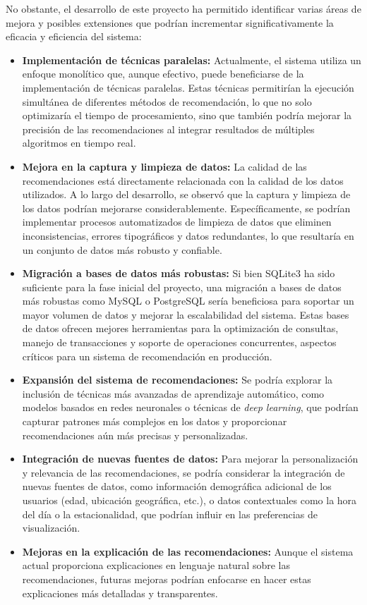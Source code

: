 \documentclass{llncs}
\begin{document}
	No obstante, el desarrollo de este proyecto ha permitido identificar varias áreas de mejora y posibles extensiones que podrían incrementar significativamente la eficacia y eficiencia del sistema:
	
	\begin{itemize}
		\item \textbf{Implementación de técnicas paralelas:} Actualmente, el sistema utiliza un enfoque monolítico que, aunque efectivo, puede beneficiarse de la implementación de técnicas paralelas. Estas técnicas permitirían la ejecución simultánea de diferentes métodos de recomendación, lo que no solo optimizaría el tiempo de procesamiento, sino que también podría mejorar la precisión de las recomendaciones al integrar resultados de múltiples algoritmos en tiempo real.
		
		\item \textbf{Mejora en la captura y limpieza de datos:} La calidad de las recomendaciones está directamente relacionada con la calidad de los datos utilizados. A lo largo del desarrollo, se observó que la captura y limpieza de los datos podrían mejorarse considerablemente. Específicamente, se podrían implementar procesos automatizados de limpieza de datos que eliminen inconsistencias, errores tipográficos y datos redundantes, lo que resultaría en un conjunto de datos más robusto y confiable.
		
		\item \textbf{Migración a bases de datos más robustas:} Si bien SQLite3 ha sido suficiente para la fase inicial del proyecto, una migración a bases de datos más robustas como MySQL o PostgreSQL sería beneficiosa para soportar un mayor volumen de datos y mejorar la escalabilidad del sistema. Estas bases de datos ofrecen mejores herramientas para la optimización de consultas, manejo de transacciones y soporte de operaciones concurrentes, aspectos críticos para un sistema de recomendación en producción.
		
		\item \textbf{Expansión del sistema de recomendaciones:} Se podría explorar la inclusión de técnicas más avanzadas de aprendizaje automático, como modelos basados en redes neuronales o técnicas de \textit{deep learning}, que podrían capturar patrones más complejos en los datos y proporcionar recomendaciones aún más precisas y personalizadas.
		
		\item \textbf{Integración de nuevas fuentes de datos:} Para mejorar la personalización y relevancia de las recomendaciones, se podría considerar la integración de nuevas fuentes de datos, como información demográfica adicional de los usuarios (edad, ubicación geográfica, etc.), o datos contextuales como la hora del día o la estacionalidad, que podrían influir en las preferencias de visualización.
		
		\item \textbf{Mejoras en la explicación de las recomendaciones:} Aunque el sistema actual proporciona explicaciones en lenguaje natural sobre las recomendaciones, futuras mejoras podrían enfocarse en hacer estas explicaciones más detalladas y transparentes.
		
	\end{itemize}
	
\end{document}
